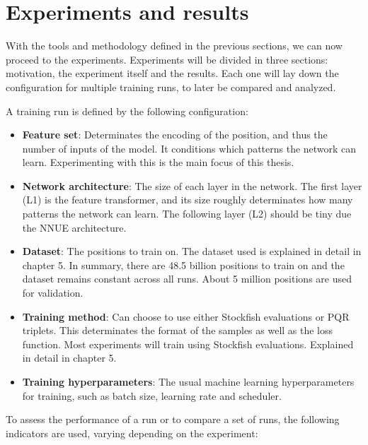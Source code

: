 \section{Experiments and results}

With the tools and methodology defined in the previous sections, we can now proceed to the experiments. Experiments will be divided in three sections: motivation, the experiment itself and the results. Each one will lay down the configuration for multiple training runs, to later be compared and analyzed.

A training run is defined by the following configuration:

\begin{itemize}
\item \textbf{Feature set}: Determinates the encoding of the position, and thus the number of inputs of the model. It conditions which patterns the network can learn. Experimenting with this is the main focus of this thesis.

\item \textbf{Network architecture}: The size of each layer in the network. The first layer (L1) is the feature transformer, and its size roughly determinates how many patterns the network can learn. The following layer (L2) should be tiny due the NNUE architecture.

\item \textbf{Dataset}: The positions to train on. The dataset used is explained in detail in chapter 5. In summary, there are 48.5 billion positions to train on and the dataset remains constant across all runs. About 5 million positions are used for validation.

\item \textbf{Training method}: Can choose to use either Stockfish evaluations or PQR triplets. This determinates the format of the samples as well as the loss function. Most experiments will train using Stockfish evaluations. Explained in detail in chapter 5.

\item \textbf{Training hyperparameters}: The usual machine learning hyperparameters for training, such as batch size, learning rate and scheduler.
\end{itemize}

To assess the performance of a run or to compare a set of runs, the following indicators are used, varying depending on the experiment:

